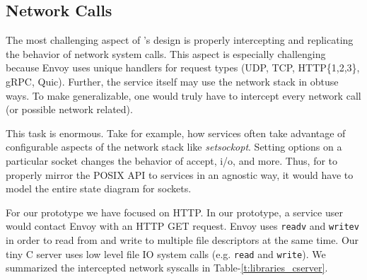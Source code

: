 \begin{table}[!ht]
    \begin{center}
        \caption{Libc Functions Preloaded (Tiny C Webserver)}
        \label{t:libraries_cserver}
    \end{center}
\end{table}

\subsection{\sysname Network Calls}
The most challenging aspect of \sysname's design is properly intercepting and replicating the behavior of network system calls. This aspect is especially challenging because Envoy uses unique handlers for request types (UDP, TCP, HTTP\{1,2,3\}, gRPC, Quic). Further, the service itself may use the network stack in obtuse ways. To make \sysname generalizable, one would truly have to intercept every network call (or possible network related). 

This task is enormous. Take for example, how services often take advantage of configurable aspects of the network stack like \textit{setsockopt}. Setting options on a particular socket changes the behavior of accept, i/o, and more. Thus, for \sysname to properly mirror the POSIX API to services in an agnostic way, it would have to model the entire state diagram for sockets. 

For our prototype we have focused on HTTP. In our prototype, a service user would contact Envoy with an HTTP GET request. Envoy uses \texttt{readv} and \texttt{writev} in order to read from and write to multiple file descriptors at the same time. Our tiny C server \cite{tiny} uses low level file IO system calls (e.g. \texttt{read} and \texttt{write}).  We summarized the intercepted network syscalls in Table-\ref{t:libraries_cserver}.


